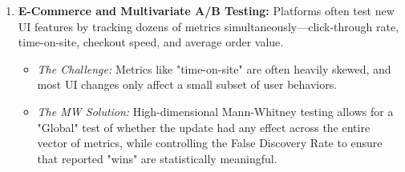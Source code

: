 \documentclass[10pt]{article}
\begin{document}
\begin{enumerate}
    \item \textbf{E-Commerce and Multivariate A/B Testing:}
    Platforms often test new UI features by tracking dozens of metrics simultaneously—click-through rate, time-on-site, checkout speed, and average order value.
    \begin{itemize}
        \item \textit{The Challenge:} Metrics like "time-on-site" are often heavily skewed, and most UI changes only affect a small subset of user behaviors.
        \item \textit{The MW Solution:} High-dimensional Mann-Whitney testing allows for a "Global" test of whether the update had any effect across the entire vector of metrics, while controlling the False Discovery Rate to ensure that reported "wins" are statistically meaningful.
    \end{itemize}
\end{enumerate}
\end{document}
